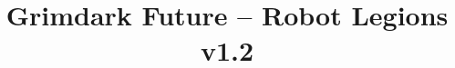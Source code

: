 \documentclass[10pt]{article}
\title{Grimdark Future – Robot Legions v1.2}
\begin{document}
\maketitle

\UnitTable{}

\begin{multicols*}{3}[]
	\begin{center}
	
	
	\end{center}
\end{multicols*}
\end{document}
